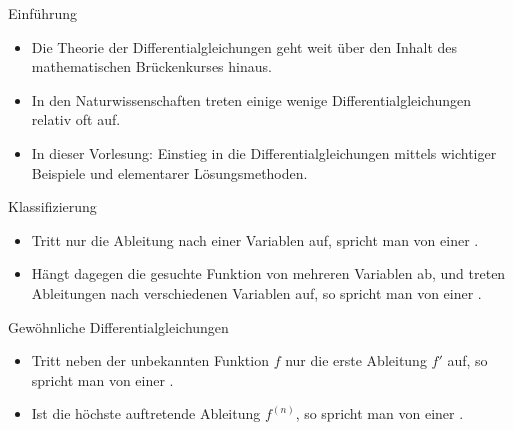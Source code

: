 \documentclass[german]{beamer}
\newcommand{\superalert}[1]{{\color{MyYellowOrange}{#1}}}
\begin{document}
\begin{frame}{Einf\"uhrung}

\begin{itemize}
\item Die Theorie der Differentialgleichungen geht weit \"uber den Inhalt des 
mathematischen Br\"uckenkurses hinaus.
\item In den Naturwissenschaften treten einige wenige Differentialgleichungen relativ oft auf.
\item In dieser Vorlesung: Einstieg in die Differentialgleichungen mittels wichtiger Beispiele und 
elementarer L\"osungsmethoden.
\end{itemize}

\end{frame}

\begin{frame}{Klassifizierung}

\begin{itemize}
\item Tritt nur die Ableitung nach einer Variablen auf, spricht man von einer
\superalert{gew\"ohnlichen Differentialgleichung}. 

\item H\"angt dagegen die gesuchte Funktion von mehreren Variablen ab, und
treten Ableitungen nach verschiedenen Variablen auf, so spricht man von einer
\superalert{partiellen Differentialgleichung}.

\end{itemize}

\end{frame}

\begin{frame}{Gew\"ohnliche Differentialgleichungen}

\begin{itemize}
\item Tritt neben der unbekannten Funktion $f$ \alert{nur die erste Ableitung $f'$} auf, so spricht man von
einer \superalert{Differentialgleichung erster Ordnung}.

\item Ist die \alert{h\"ochste auftretende Ableitung $f^{(n)}$}, so spricht man von einer
\superalert{Differentialgleichung $n$-ter Ordnung}.
\end{itemize}

\end{frame}
\end{document}
